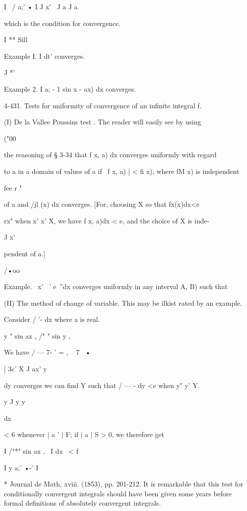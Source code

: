 I \ / a;' • I J x' \ J a J a 

which is the condition for convergence. 

I ** Sill   

Example I. I   dt' converges. 

J *' 

Example 2. I a; - 1 sin  x  - ax) dx converges. 

4-431. Tests for uniformity of convergence of an infinite integral f. 

(I) De la Vallee Poussins test . The reader will easily see by using 

("00 

the reasoning of § 3-34 that f x, a) dx converges uniformly with regard 

to a in a domain of values of a if \ f x, a) | < fi x), where fM x) is independent 

fee r " 

of a and /jl (x) dx converges. [For, choosing X so that fx(x)dx<e 

rx" 
when x' x' X, we have f x, a)dx < e, and the choice of X is inde- 

J x' 

pendent of a.] 

/•oo 

Example. \ x' ~' e~''dx converges uniformly in any interval  A, B) such that 

(II) The method of change of variable. 
This may be ilkist rated by an example. 

Consider / '- dx where a is real. 

y " sin ax , /"  " sin y , 

We have / — 7- '  = , ~ 7~  • 

] 3c' X   J ax' y 

   dy converges we can find Y such that / — -  dy <e when y" y'   Y. 

y J y y 






dx 



< 6 whenever | a ' |   F; if | a |   S > 0, we therefore get 

I /"*" sin ax , \ 
I dx \ < f 

I y a;' •-' I 



* Journal de Math, xviii. (1853), pp. 201-212. It is remarkable that this test for conditionally 
convergent integrals should have been given some years before formal definitions of absolutely 
convergent integrals. 

